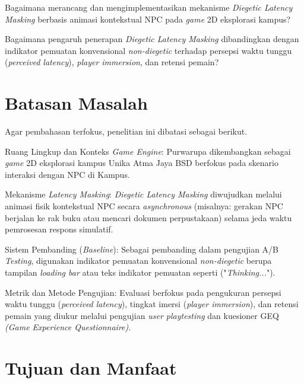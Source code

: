 \begin{rumusanmasalah}
    \item Bagaimana merancang dan mengimplementasikan mekanisme \textit{Diegetic Latency Masking} berbasis animasi kontekstual NPC pada \textit{game} 2D eksplorasi kampus?\label{rq:design}
    \item Bagaimana pengaruh penerapan \textit{Diegetic Latency Masking} dibandingkan dengan indikator pemuatan konvensional \textit{non-diegetic} terhadap persepsi waktu tunggu (\textit{perceived latency}), \textit{player immersion}, dan retensi pemain?\label{rq:evaluation}
\end{rumusanmasalah}

\section{Batasan Masalah}
Agar pembahasan terfokus, penelitian ini dibatasi sebagai berikut.

\begin{daftarnomor}
    \item Ruang Lingkup dan Konteks \textit{Game Engine}: Purwarupa dikembangkan sebagai \textit{game} 2D eksplorasi kampus Unika Atma Jaya BSD berfokus pada skenario interaksi dengan NPC di Kampus.
    \item Mekanisme \textit{Latency Masking}: \textit{Diegetic Latency Masking} diwujudkan melalui animasi fisik kontekstual NPC secara \textit{asynchronous} (misalnya: gerakan NPC berjalan ke rak buku atau mencari dokumen perpustakaan) selama jeda waktu pemrosesan respons simulatif.
    \item Sistem Pembanding (\textit{Baseline}): Sebagai pembanding dalam pengujian A/B \textit{Testing}, digunakan indikator pemuatan konvensional \textit{non-diegetic} berupa tampilan \textit{loading bar} atau teks indikator pemuatan seperti ("\textit{Thinking...}").
    \item Metrik dan Metode Pengujian: Evaluasi berfokus pada pengukuran persepsi waktu tunggu (\textit{perceived latency}), tingkat imersi (\textit{player immersion}), dan retensi pemain yang diukur melalui pengujian \textit{user playtesting} dan kuesioner GEQ \textit{(Game Experience Questionnaire)}.
\end{daftarnomor}

\section{Tujuan dan Manfaat}

